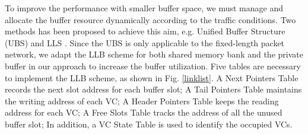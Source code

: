 \documentclass[10pt,conference]{IEEEtran}
\begin{document}
To improve the performance with smaller buffer space, we must manage and allocate the buffer resource dynamically according to the traffic conditions. Two methods has been proposed to achieve this aim, e.g. Unified Buffer Structure (UBS) \cite{NPKV06}\cite{5770788} and LLS \cite{4555894}\cite{Neishaburi:2009:RAN:1531542.1531658}. Since the UBS is only applicable to the fixed-length packet network, we adapt the LLB scheme for both shared memory bank and the private buffer in our approach to increase the buffer utilization. Five tables are necessary to implement the LLB scheme, as shown in Fig. \ref{linklist}. A Next Pointers Table records the next slot address for each buffer slot; A Tail Pointers Table maintains the writing address of each VC; A Header Pointers Table keeps the reading address for each VC; A Free Slots Table tracks the address of all the unused buffer slot; In addition, a VC State Table is used to identify the occupied VCs.

\end{document}
